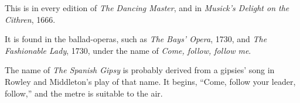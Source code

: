 

\vspace{-1.5\baselineskip}


\vspace{-0.5\baselineskip}

This is in every edition of \textit{The Dancing Master}, and in \textit{Musick’s Delight on
the Cithren}, 1666.

It is found in the ballad-operas, such as \textit{The Bays’ Opera}, 1730, and \textit{The
Fashionable Lady}, 1730, under the name of \textit{Come, follow, follow me}.

The name of \textit{The Spanish Gipsy} is probably derived from a gipsies’ song in
Rowley and Middleton’s play of that name. It begins, “Come, follow your
leader, follow,” and the metre is suitable to the air.

